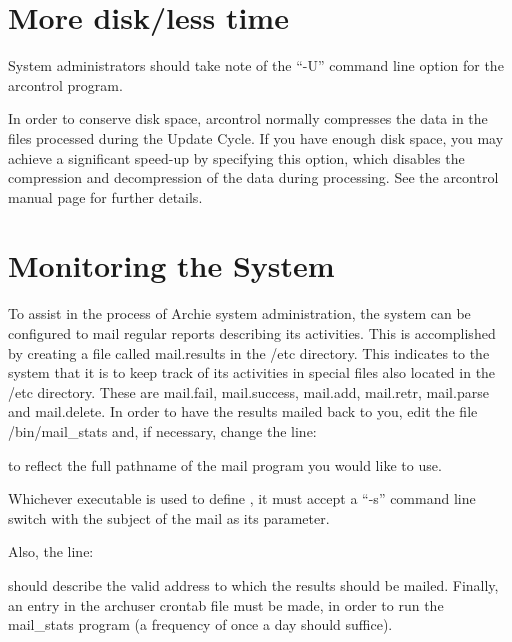 
%
%
%

\section{More disk/less time}

System administrators should take note of the ``-U'' command line option for
the arcontrol program.

In order to conserve disk space, arcontrol normally compresses the data in the
files processed during the Update Cycle.  If you have enough disk space, you
may achieve a significant speed-up by specifying this option, which disables
the compression and decompression of the data during processing.  See the
arcontrol manual page for further details.

%
%
%

\section{Monitoring the System}
To assist in the process of Archie system administration, the system can be
configured to mail regular reports describing its activities. This is
accomplished by creating a file called mail.results in the \archie/etc
directory. This indicates to the system that it is to keep track of its
activities in special files also located in the \archie/etc directory. These
are mail.fail, mail.success, mail.add, mail.retr, mail.parse and
mail.delete. In order to have the results mailed back to you, edit the file
\archie/bin/mail\_stats and, if necessary, change the line:


to reflect the full pathname of the mail program you would like to use. 

Whichever executable is used to define , it must accept a ``-s''
command line switch with the subject of the mail as its parameter.

Also, the line: 


should describe the valid address to which the results should be mailed. Finally, an entry in the archuser crontab file must be made, in order to run the mail\_stats program (a frequency of once a day should suffice).



